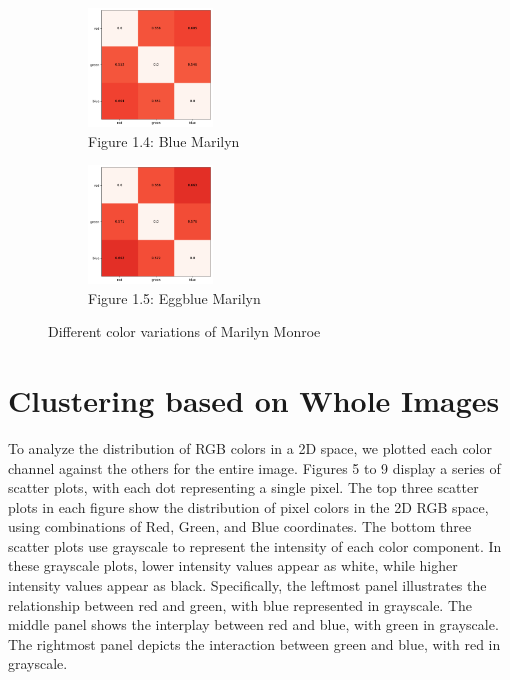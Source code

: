 \documentclass{article}
\begin{document}
\begin{figure}[ht]
  \begin{minipage}{0.6\textwidth}
    \centering
    \begin{subfigure}{0.45\textwidth}
      \centering
      \includegraphics[width=125px]{main_files/figure-latex/3_4_blue_marilyn_entropy.pdf}
      \caption{Figure 1.4: Blue Marilyn}
      \label{fig:1_4_blue_marilyn}
    \end{subfigure}
    \hfill
    \begin{subfigure}{0.45\textwidth}
      \centering
      \includegraphics[width=125px]{main_files/figure-latex/3_5_eggblue_marilyn_entropy.pdf}
      \caption{Figure 1.5: Eggblue Marilyn}
      \label{fig:1_5_eggblue_marilyn}
    \end{subfigure}
  \end{minipage}

  \caption{Different color variations of Marilyn Monroe}
  \label{fig:marilyn_variations}
\end{figure}

\hypertarget{clustering-based-on-whole-images}{%
\section{Clustering based on Whole
Images}\label{clustering-based-on-whole-images}}

To analyze the distribution of RGB colors in a 2D space, we plotted each
color channel against the others for the entire image. Figures 5 to 9
display a series of scatter plots, with each dot representing a single
pixel. The top three scatter plots in each figure show the distribution
of pixel colors in the 2D RGB space, using combinations of Red, Green,
and Blue coordinates. The bottom three scatter plots use grayscale to
represent the intensity of each color component. In these grayscale
plots, lower intensity values appear as white, while higher intensity
values appear as black. Specifically, the leftmost panel illustrates the
relationship between red and green, with blue represented in grayscale.
The middle panel shows the interplay between red and blue, with green in
grayscale. The rightmost panel depicts the interaction between green and
blue, with red in grayscale.
\end{document}
